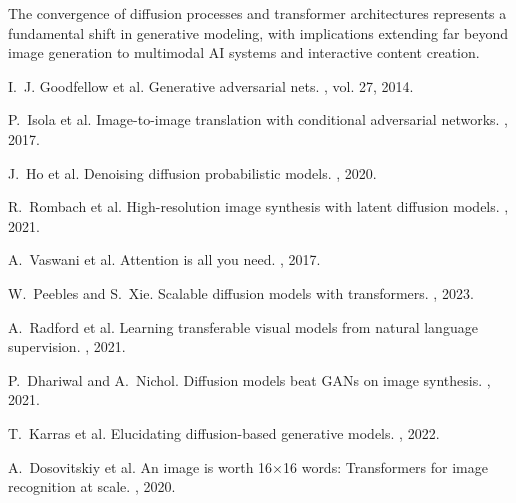 \documentclass[a4paper]{article}
\begin{document}
The convergence of diffusion processes and transformer architectures represents a fundamental shift in generative modeling, with implications extending far beyond image generation to multimodal AI systems and interactive content creation.

\begin{thebibliography}{99}

I.~J. Goodfellow et al.
\newblock Generative adversarial nets.
, vol. 27, 2014.

P.~Isola et al.
\newblock Image-to-image translation with conditional adversarial networks.
, 2017.

J.~Ho et al.
\newblock Denoising diffusion probabilistic models.
, 2020.

R.~Rombach et al.
\newblock High-resolution image synthesis with latent diffusion models.
, 2021.

A.~Vaswani et al.
\newblock Attention is all you need.
, 2017.

W.~Peebles and S.~Xie.
\newblock Scalable diffusion models with transformers.
, 2023.

A.~Radford et al.
\newblock Learning transferable visual models from natural language supervision.
, 2021.

P.~Dhariwal and A.~Nichol.
\newblock Diffusion models beat GANs on image synthesis.
, 2021.

T.~Karras et al.
\newblock Elucidating diffusion-based generative models.
, 2022.

A.~Dosovitskiy et al.
\newblock An image is worth 16×16 words: Transformers for image recognition at scale.
, 2020.

\end{thebibliography}
\end{document}

